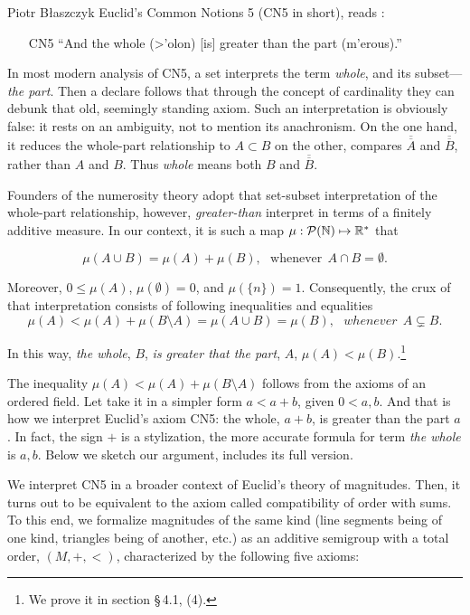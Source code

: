 \begin{artengenv}{Piotr Błaszczyk}
Euclid's Common Notions 5 (CN5 in short), reads \parencite[English translations of the \textit{Elements} after Fitzpatrick][]{ref_fitz}:

\begin{enumerate}
\item[CN5] ``And the whole (\foreignlanguage{polutonikogreek}{>'olon}) [is] greater than the part (\foreignlanguage{polutonikogreek}{m'erous}).''
\end{enumerate}

In most modern analysis of CN5, a set interprets the term \textit{whole}, and its subset---\textit{the part}. Then a declare follows that through the concept of cardinality they can debunk that old, seemingly standing axiom.  Such an interpretation is obviously false: it rests on an ambiguity, not to mention its anachronism. On the one hand, it reduces the whole-part relationship  to $A\subset B$ on the other,  compares $\overline{\overline{A}}$ and   
$\overline{\overline{B}}$, rather than $A$ and $B$. Thus \textit{whole} means both $B$ and $\overline{\overline{B}}$.

Founders of the numerosity theory adopt that set-subset interpretation of the whole-part relationship, however, 
\textit{greater-than} interpret in terms of a finitely additive measure. In our context, it is such a map
$\mu:\mathcal P({\mathbb{N}})\mapsto {\mathbb{R}}^*$ that

\[\mu(A\cup B)=\mu(A)+\mu(B),\ \ \ \mbox{whenever}\ \ A\cap B=\emptyset {.} \]

Moreover,  $0\leq \mu(A)$, $\mu(\emptyset)=0$, and $\mu(\{n\})=1$.
Consequently, the crux of that interpretation consists of following 
inequalities and equalities
\[\mu(A)<\mu(A)+\mu(B\setminus A)=\mu (A\cup B)=\mu(B),\ \ \ {whenever}\ \ A\subsetneq B. \]

In this way, \textit{the whole}, $B$, \textit{is greater that the part}, $A$, $\mu(A)<\mu(B)$.\footnote{We prove it in section \S\,4.1, (4).}

The 
inequality $\mu(A)<\mu(A)+\mu(B\setminus A)$ follows from the axioms of an ordered field. Let take it in a simpler form $a<a+b$, given $0<a, b$. And that is how we interpret Euclid's axiom CN5: the whole, $a+b$, is greater than the part $a$. In fact, the sign $+$ is a stylization, the more accurate formula for term \textit{the whole} is  $a,b$.
Below we sketch our argument, \parencite{ref_bmp20} includes its full version. 

 We interpret CN5 in a broader context of Euclid's theory of magnitudes. Then, it turns out to be equivalent to the axiom called compatibility of order with sums.
To this end, we formalize  magnitudes of the same kind
(line segments being of one kind, triangles being of another, etc.) as an additive
semigroup with a total order, \mbox{$(M,+,<)$,} characterized by the following five axioms:


\end{artengenv}
